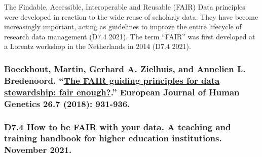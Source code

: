 \documentclass[
]{book}
\begin{document}
The Findable, Accessible, Interoperable and Reusable (FAIR) Data principles were developed in reaction to the wide reuse of scholarly data. They have become increasingly important, acting as guidelines to improve the entire lifecycle of research data management (D7.4 2021). The term ``FAIR'' was first developed at a Lorentz workshop in the Netherlands in 2014 (D7.4 2021).

\hypertarget{boeckhout-martin-gerhard-a.-zielhuis-and-annelien-l.-bredenoord.-the-fair-guiding-principles-for-data-stewardship-fair-enough.-european-journal-of-human-genetics-26.7-2018-931-936.}{%
\subsubsection*{\texorpdfstring{Boeckhout, Martin, Gerhard A. Zielhuis, and Annelien L. Bredenoord. ``\href{https://www.ncbi.nlm.nih.gov/pmc/articles/PMC6018669/}{The FAIR guiding principles for data stewardship: fair enough?}.'' European Journal of Human Genetics 26.7 (2018): 931-936.}{Boeckhout, Martin, Gerhard A. Zielhuis, and Annelien L. Bredenoord. ``The FAIR guiding principles for data stewardship: fair enough?.'' European Journal of Human Genetics 26.7 (2018): 931-936.}}\label{boeckhout-martin-gerhard-a.-zielhuis-and-annelien-l.-bredenoord.-the-fair-guiding-principles-for-data-stewardship-fair-enough.-european-journal-of-human-genetics-26.7-2018-931-936.}}

\hypertarget{d7.4-how-to-be-fair-with-your-data.-a-teaching-and-training-handbook-for-higher-education-institutions.-november-2021.}{%
\subsubsection*{\texorpdfstring{D7.4 \href{https://zenodo.org/record/5837500\#.Yhk8L5PMJ6e}{How to be FAIR with your data}. A teaching and training handbook for higher education institutions. November 2021.}{D7.4 How to be FAIR with your data. A teaching and training handbook for higher education institutions. November 2021.}}\label{d7.4-how-to-be-fair-with-your-data.-a-teaching-and-training-handbook-for-higher-education-institutions.-november-2021.}}
\end{document}

